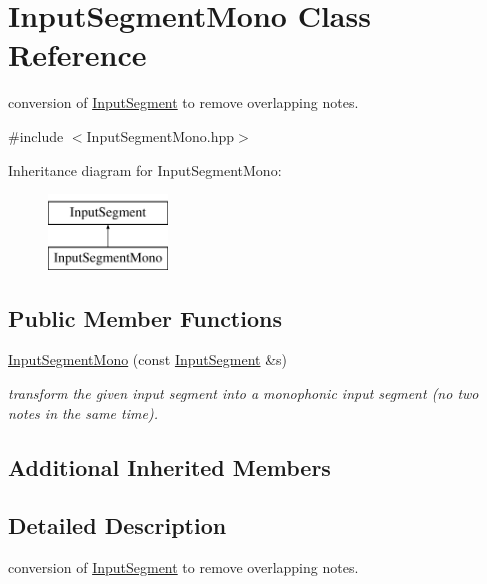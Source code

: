 \hypertarget{classInputSegmentMono}{}\section{Input\+Segment\+Mono Class Reference}
\label{classInputSegmentMono}


conversion of \mbox{\hyperlink{classInputSegment}{Input\+Segment}} to remove overlapping notes.  




{\ttfamily \#include $<$Input\+Segment\+Mono.\+hpp$>$}

Inheritance diagram for Input\+Segment\+Mono\+:\begin{figure}[H]
\begin{center}
\leavevmode
\includegraphics[height=2.000000cm]{classInputSegmentMono}
\end{center}
\end{figure}
\subsection*{Public Member Functions}
\begin{DoxyCompactItemize}
\item 
\mbox{\hyperlink{group__segment_gad033d12a18d0f8cd7a8b0a2f5f029db2}{Input\+Segment\+Mono}} (const \mbox{\hyperlink{classInputSegment}{Input\+Segment}} \&s)
\begin{DoxyCompactList}\small\item\em transform the given input segment into a monophonic input segment (no two notes in the same time). \end{DoxyCompactList}\end{DoxyCompactItemize}
\subsection*{Additional Inherited Members}


\subsection{Detailed Description}
conversion of \mbox{\hyperlink{classInputSegment}{Input\+Segment}} to remove overlapping notes. 

